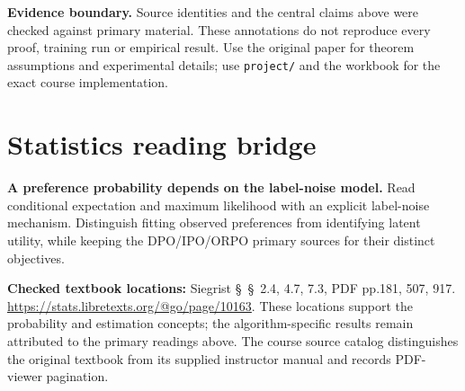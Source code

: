 \documentclass[11pt]{scrartcl}
\begin{document}
\noindent\textbf{Evidence boundary.} Source identities and the central claims above were checked against primary material. These annotations do not reproduce every proof, training run or empirical result. Use the original paper for theorem assumptions and experimental details; use \texttt{project/} and the workbook for the exact course implementation.
\section*{Statistics reading bridge}
\textbf{A preference probability depends on the label-noise model.} Read conditional expectation and maximum likelihood with an explicit label-noise mechanism. Distinguish fitting observed preferences from identifying latent utility, while keeping the DPO/IPO/ORPO primary sources for their distinct objectives.

\textbf{Checked textbook locations:} Siegrist \S~\S~2.4, 4.7, 7.3, PDF pp.181, 507, 917. \url{https://stats.libretexts.org/@go/page/10163}. These locations support the probability and estimation concepts; the algorithm-specific results remain attributed to the primary readings above. The course source catalog distinguishes the original textbook from its supplied instructor manual and records PDF-viewer pagination.
\end{document}

